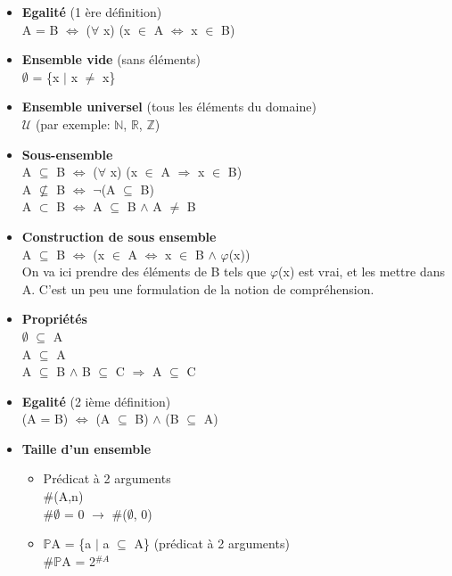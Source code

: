 \begin{itemize}
\item \textbf{Egalité} (1 ère définition) \\
A = B $\Leftrightarrow$ ($\forall$ x) (x $\in$ A $\Leftrightarrow$ x $\in$ B)\\
\item \textbf{Ensemble vide} (sans éléments)\\
$\emptyset$ = \{x $\vert$ x $\neq$ x\}\\
\item \textbf{Ensemble universel} (tous les éléments du domaine)\\
$\mathcal{U}$ (par exemple: $\mathbb{N}$, $\mathbb{R}$, $\mathbb{Z}$)\\
\item \textbf{Sous-ensemble}\\
A $\subseteq$ B $\Leftrightarrow$ ($\forall$ x) (x $\in$ A $\Rightarrow$ x $\in$ B)\\
A $\nsubseteq$ B $\Leftrightarrow$ $\neg$(A $\subseteq$ B)\\
A $\subset$ B $\Leftrightarrow$ A $\subseteq$ B $\wedge$ A $\neq$ B\\
\item \textbf{Construction de sous ensemble} \\
A $\subseteq$ B $\Leftrightarrow$ (x $\in$ A $\Leftrightarrow$ x $\in$ B $\wedge$ $\varphi$(x))\\
On va ici prendre des éléments de B tels que $\varphi$(x) est vrai, et les mettre dans A. C'est un peu une formulation de la notion de compréhension.\\ 
\item \textbf{Propriétés}\\
$\emptyset$ $\subseteq$ A\\
A $\subseteq$ A\\
A $\subseteq$ B $\wedge$ B $\subseteq$ C $\Rightarrow$ A $\subseteq$ C \\
\item \textbf{Egalité} (2 ième définition)\\
(A = B) $\Leftrightarrow$ (A $\subseteq$ B) $\wedge$ (B $\subseteq$ A)\\
\item \textbf{Taille d'un ensemble} 
    \begin{itemize}
    \item Prédicat à 2 arguments\\
    \#(A,n) \\
    \#$\emptyset$ = 0  $\rightarrow$ \#($\emptyset$, 0) 
    \item $\mathbb{P}$A = \{a $\vert$ a $\subseteq$ A\} (prédicat à 2 arguments)\\
    \#$\mathbb{P}$A = 2$^{\#A}$ \\
    \end{itemize}
\end{itemize}

